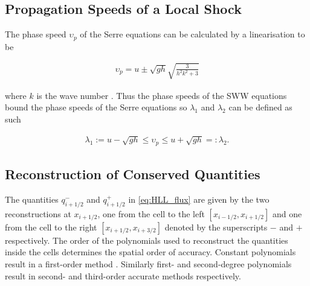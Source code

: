 \documentclass[SingleSpace,12pt,Proceedings]{Serre_ASCE}
\begin{document}
\subsection{Propagation Speeds of a Local Shock} %
The phase speed $\upsilon_p$ of the Serre equations can be calculated by a linearisation to be
\begin{linenomath*}
\begin{gather*}
 \upsilon_p = u \pm \sqrt{gh}\sqrt{\frac{3}{h^2k^2 + 3}}
\end{gather*}
\end{linenomath*}
where $k$ is the wave number \cite{Zoppou-2014}. Thus the phase speeds of the SWW equations bound the phase speeds of the Serre equations so $\lambda_1$ and $\lambda_2$ can be defined as such
\begin{linenomath*}
\begin{gather*}
 \lambda_1 := u - \sqrt{gh} \le \upsilon_p \le u + \sqrt{gh} =: \lambda_2 .
\end{gather*}
\end{linenomath*}
\subsection{Reconstruction of Conserved Quantities} %
The quantities $q^-_{i + 1/2}$ and $q^+_{i + 1/2}$ in \eqref{eq:HLL_flux} are given by the two reconstructions at $x_{i + 1/2}$, one from the cell to the left $[x_{i - 1/2}, x_{i+ 1/2}]$ and one from the cell to the right $[x_{i + 1/2}, x_{i+ 3/2}]$ denoted by the superscripts $-$ and $+$ respectively. The order of the polynomials used to reconstruct the quantities inside the cells determines the spatial order of accuracy. Constant polynomials result in a first-order method \cite{Godunov-1959-271}. Similarly first- and second-degree polynomials result in second- and third-order accurate methods respectively. 
\end{document}
